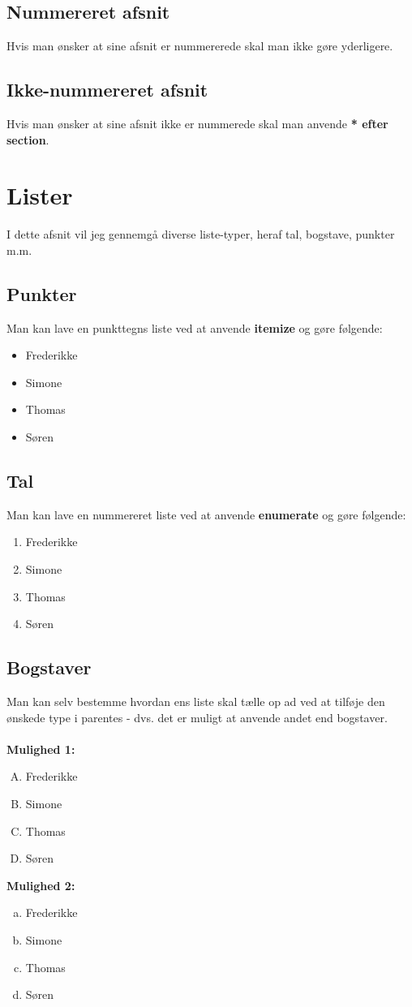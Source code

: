 \documentclass[11pt]{article}
\begin{document}
\subsection{Nummereret afsnit}
Hvis man ønsker at sine afsnit er nummererede skal man ikke gøre yderligere.

\subsection*{Ikke-nummereret afsnit}
Hvis man ønsker at sine afsnit ikke er nummerede skal man anvende \textbf{* efter section}. 
\clearpage

\section{Lister}
I dette afsnit vil jeg gennemgå diverse liste-typer, heraf tal, bogstave, punkter m.m.
\subsection{Punkter}
Man kan lave en punkttegns liste ved at anvende \textbf{itemize} og gøre følgende:
\begin{itemize}
\item Frederikke
\item Simone
\item Thomas
\item Søren
\end{itemize}
\subsection{Tal}
Man kan lave en nummereret liste ved at anvende \textbf{enumerate} og gøre følgende: 
\begin{enumerate}
\item Frederikke
\item Simone
\item Thomas
\item Søren
\end{enumerate}
\subsection{Bogstaver}
Man kan selv bestemme hvordan ens liste skal tælle op ad ved at tilføje den ønskede type i parentes - dvs. det er muligt at anvende andet end bogstaver. \\\\
\textbf{Mulighed 1:}
\begin{enumerate}[A.]
\item Frederikke
\item Simone
\item Thomas
\item Søren
\end{enumerate}
\vspace{0.5cm}
\textbf{Mulighed 2:}
\begin{enumerate}[a.]
\item Frederikke
\item Simone
\item Thomas
\item Søren
\end{enumerate}
\end{document}

